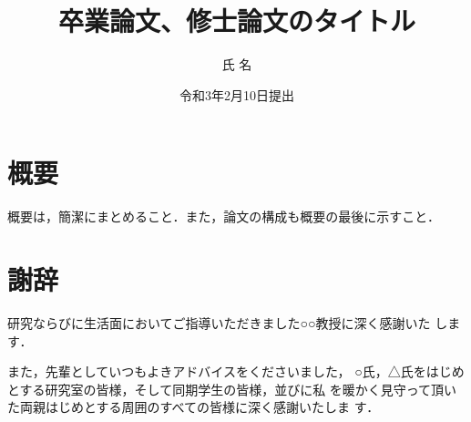 \documentclass[12pt,epsf]{jreport}
\begin{document}

\title{卒業論文、修士論文のタイトル} 


\author{氏 名}


\date{令和3年2月10日提出}




\maketitle

\setcounter{page}{1}
\chapter*{概要}

 概要は，簡潔にまとめること．また，論文の構成も概要の最後に示すこと．



\chapter*{謝辞}


研究ならびに生活面においてご指導いただきました○○教授に深く感謝いた
します．

また，先輩としていつもよきアドバイスをくださいました，
○氏，△氏をはじめとする研究室の皆様，そして同期学生の皆様，並びに私
を暖かく見守って頂いた両親はじめとする周囲のすべての皆様に深く感謝いたしま
す．
\end{document}
